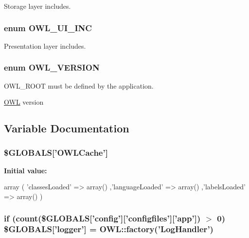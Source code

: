 Storage layer includes. 

\subsubsection[{OWL\_\-UI\_\-INC}]{\setlength{\rightskip}{0pt plus 5cm}enum {\bf OWL\_\-UI\_\-INC}}\label{OWLloader_8php_a2e11101c70f011a91d0d9c7f8e217738}


Presentation layer includes. 

\subsubsection[{OWL\_\-VERSION}]{\setlength{\rightskip}{0pt plus 5cm}enum {\bf OWL\_\-VERSION}}\label{OWLloader_8php_ab34b15a08db8691330db97cccd4d6140}


OWL\_\-ROOT must be defined by the application. 

\hyperlink{classOWL}{OWL} version 

\subsection{Variable Documentation}
\subsubsection[{\$GLOBALS}]{\setlength{\rightskip}{0pt plus 5cm}\$GLOBALS\mbox{[}'OWLCache'\mbox{]}}\label{OWLloader_8php_a79190ec221c2b52403f7324f1d224c8f}
{\bfseries Initial value:}
\begin{DoxyCode}
 array (
         'classesLoaded' => array()
        ,'languageLoaded' => array()
        ,'labelsLoaded' => array()
)
\end{DoxyCode}
\subsubsection[{\$GLOBALS}]{\setlength{\rightskip}{0pt plus 5cm}if (count(\$GLOBALS\mbox{[}'config'\mbox{]}\mbox{[}'configfiles'\mbox{]}\mbox{[}'app'\mbox{]}) $>$ 0) \$GLOBALS\mbox{[}'logger'\mbox{]} = OWL::factory('{\bf LogHandler}')}\label{OWLloader_8php_a5657c6427a5b1e3d4450f366cddef80a}
